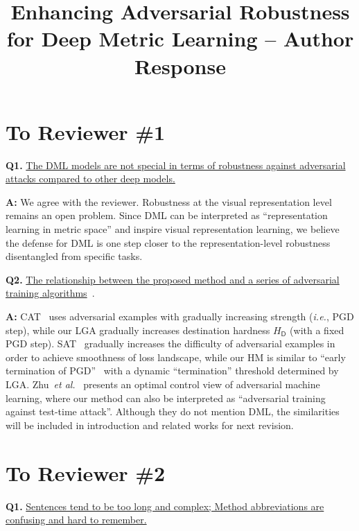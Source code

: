 \documentclass[10pt,twocolumn,letterpaper]{article}
\begin{document}
\title{Enhancing Adversarial Robustness for Deep Metric Learning -- Author Response}  %

\maketitle
\thispagestyle{empty}
\appendix

\section*{To Reviewer \#1}

\noindent\textbf{Q1.}
%
\ul{
The DML models are not special in terms of robustness against
adversarial attacks compared to other deep models.
}

\noindent\textbf{A:} 
%
We agree with the reviewer. Robustness at the visual representation level
remains an open problem. Since DML can be interpreted as ``representation
learning in metric space'' and inspire visual representation learning, we
believe the defense for DML is one step closer to the representation-level
robustness disentangled from specific tasks.

\noindent\textbf{Q2.}
%
\ul{
The relationship between the proposed method and a series of
adversarial training algorithms}~\cite{smoothat,currat,optcontrolaml}.

\noindent\textbf{A:}
%
CAT~\cite{currat} uses adversarial examples with gradually increasing strength
(\emph{i.e.}, PGD step), while our LGA gradually increases destination hardness
$H_\mathsf{D}$ (with a fixed PGD step).
%
SAT~\cite{smoothat} gradually increases the difficulty of adversarial examples
in order to achieve smoothness of loss landscape, while our HM is similar to
``early termination of PGD''~\cite{smoothat} with a dynamic ``termination''
threshold determined by LGA.
%
Zhu~\emph{et al.}~\cite{optcontrolaml} presents an optimal control view of
adversarial machine learning, where our method can also be interpreted as
``adversarial training against test-time attack''.
%
Although they do not mention DML, the similarities will be included in
introduction and related works for next revision.


\section*{To Reviewer \#2}

\noindent\textbf{Q1.}
%
\ul{
Sentences tend to be too long and complex; Method abbreviations are confusing
and hard to remember.
}
\end{document}
